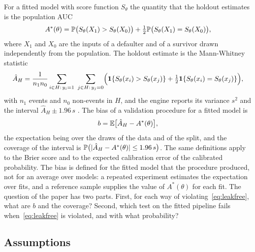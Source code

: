 For a fitted model with score function $S_\theta$ the quantity that the holdout estimates is the population AUC
\begin{equation}
A^{\ast}(\theta)=\mathbb{P}\bigl(S_\theta(X_1)>S_\theta(X_0)\bigr)+\tfrac12\mathbb{P}\bigl(S_\theta(X_1)=S_\theta(X_0)\bigr),
\label{eq:aucstar}
\end{equation}
where $X_1$ and $X_0$ are the inputs of a defaulter and of a survivor drawn independently from the population. The holdout estimate is the Mann-Whitney statistic
\begin{equation}
\hat A_H=\frac{1}{n_1n_0}\sum_{i\in H:\,y_i=1}\ \sum_{j\in H:\,y_j=0}\Bigl(\indic\{S_\theta(x_i)>S_\theta(x_j)\}+\tfrac12\indic\{S_\theta(x_i)=S_\theta(x_j)\}\Bigr),
\label{eq:auchat}
\end{equation}
with $n_1$ events and $n_0$ non-events in $H$, and the engine reports its variance $s^2$ and the interval $\hat A_H\pm1.96\,s$ \citep{delong1988,hanley1982}. The bias of a validation procedure for a fitted model is
\begin{equation}
b=\mathbb{E}\bigl[\hat A_H-A^{\ast}(\theta)\bigr],
\label{eq:bias}
\end{equation}
the expectation being over the draws of the data and of the split, and the coverage of the interval is $\mathbb{P}\bigl(|\hat A_H-A^{\ast}(\theta)|\le1.96\,s\bigr)$. The same definitions apply to the Brier score and to the expected calibration error of the calibrated probability. The bias is defined for the fitted model that the procedure produced, not for an average over models: a repeated experiment estimates the expectation over fits, and a reference sample supplies the value of $A^{\ast}(\theta)$ for each fit. The question of the paper has two parts. First, for each way of violating~\eqref{eq:leakfree}, what are $b$ and the coverage? Second, which test on the fitted pipeline fails when~\eqref{eq:leakfree} is violated, and with what probability?

\subsection{Assumptions}

